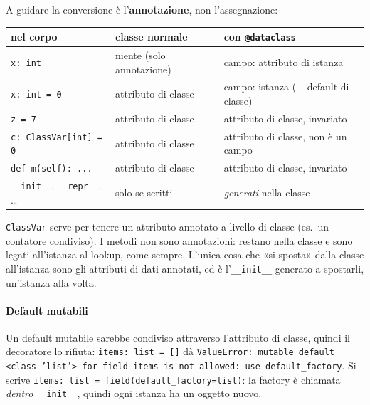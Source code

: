 \documentclass[a4paper,12pt]{article}
\begin{document}
A guidare la conversione è l'\textbf{annotazione}, non l'assegnazione:
\begin{center}
\small
\begin{tabular}{|l|l|l|}
\hline
\textbf{nel corpo} & \textbf{classe normale} & \textbf{con \texttt{@dataclass}} \\
\hline
\texttt{x: int} & niente (solo annotazione) & campo: attributo di istanza \\
\texttt{x: int = 0} & attributo di classe & campo: istanza (+ default di classe) \\
\texttt{z = 7} & attributo di classe & attributo di classe, invariato \\
\texttt{c: ClassVar[int] = 0} & attributo di classe & attributo di classe, non è un campo \\
\texttt{def m(self): ...} & attributo di classe & attributo di classe, invariato \\
\texttt{\_\_init\_\_}, \texttt{\_\_repr\_\_}, \dots & solo se scritti & \emph{generati} nella classe \\
\hline
\end{tabular}
\end{center}
\texttt{ClassVar} serve per tenere un attributo annotato a livello di classe (es.\ un contatore
condiviso). I metodi non sono annotazioni: restano nella classe e sono legati all'istanza al
lookup, come sempre. L'unica cosa che «si sposta» dalla classe all'istanza sono gli attributi
di dati annotati, ed è l'\texttt{\_\_init\_\_} generato a spostarli, un'istanza alla volta.

\paragraph{Default mutabili} Un default mutabile sarebbe condiviso attraverso l'attributo di
classe, quindi il decoratore lo rifiuta: \texttt{items: list = []} dà \texttt{ValueError: mutable
default <class 'list'> for field items is not allowed: use default\_factory}. Si scrive
\texttt{items: list = field(default\_factory=list)}: la factory è chiamata \emph{dentro}
\texttt{\_\_init\_\_}, quindi ogni istanza ha un oggetto nuovo.
\end{document}
